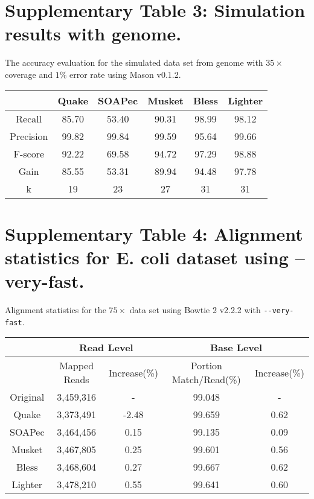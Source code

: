 \documentclass[10pt]{article}
\begin{document}
\section*{Supplementary Table 3: Simulation results with \elegans genome.}

The accuracy evaluation for the simulated data set from \elegans genome with $35\times$ coverage and $1\%$ error rate using Mason \cite{holtgrewe2010mason} v0.1.2.

\begin{table}[h!]
\begin{tabular}{|c|c|c|c|c|c|} \hline
	&Quake	&SOAPec	&Musket	&Bless	&Lighter \\ \hline
Recall	&85.70	&53.40	&90.31	&98.99	&98.12 \\ \hline
Precision	&99.82	&99.84	&99.59	&95.64	&99.66 \\ \hline
F-score	&92.22	&69.58	&94.72	&97.29	&98.88 \\ \hline
Gain	&85.55	&53.31	&89.94	&94.48	&97.78 \\ \hline
k	    & 19	&	23 &	27 &	31 & 31 \\ \hline
\end{tabular}
\end{table}
\clearpage

\section*{Supplementary Table 4: Alignment statistics for E. coli dataset using --very-fast.}

Alignment statistics for the $75\times$ \ecoli data set using Bowtie 2 \cite{langmead2012fast} v2.2.2 with \verb+--very-fast+.

\begin{table}[h!] 
\begin{tabular}{|c|c|c||c|c|} \hline
	 & \multicolumn{2}{|c||}{Read Level} & \multicolumn{2}{|c|}{Base Level} \\ \hline
     & Mapped Reads & Increase(\%) & Portion Match/Read(\%) & Increase(\%) \\ \hline
Original&	3,459,316&	-&	99.048 & - \\ \hline 
Quake&	3,373,491&	-2.48&	99.659 & 0.62 \\ \hline
SOAPec&	3,464,456&	0.15&	99.135 & 0.09 \\ \hline
Musket&	3,467,805&	0.25&	99.601 & 0.56 \\ \hline
Bless&	3,468,604&	0.27&	99.667 & 0.62\\ \hline
Lighter&	3,478,210&	0.55&	99.641 & 0.60 \\ \hline
\end{tabular}
\end{table}
\clearpage
\end{document}
